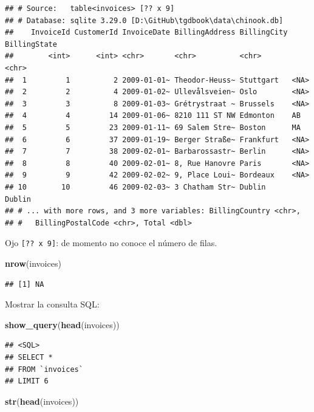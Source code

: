 \documentclass[]{book}
\newenvironment{Shaded}{\begin{snugshade}}{\end{snugshade}}
\newcommand{\KeywordTok}[1]{\textcolor[rgb]{0.13,0.29,0.53}{\textbf{#1}}}
\newcommand{\NormalTok}[1]{#1}
\begin{document}
\begin{verbatim}
## # Source:   table<invoices> [?? x 9]
## # Database: sqlite 3.29.0 [D:\GitHub\tgdbook\data\chinook.db]
##    InvoiceId CustomerId InvoiceDate BillingAddress BillingCity BillingState
##        <int>      <int> <chr>       <chr>          <chr>       <chr>       
##  1         1          2 2009-01-01~ Theodor-Heuss~ Stuttgart   <NA>        
##  2         2          4 2009-01-02~ Ullevålsveien~ Oslo        <NA>        
##  3         3          8 2009-01-03~ Grétrystraat ~ Brussels    <NA>        
##  4         4         14 2009-01-06~ 8210 111 ST NW Edmonton    AB          
##  5         5         23 2009-01-11~ 69 Salem Stre~ Boston      MA          
##  6         6         37 2009-01-19~ Berger Straße~ Frankfurt   <NA>        
##  7         7         38 2009-02-01~ Barbarossastr~ Berlin      <NA>        
##  8         8         40 2009-02-01~ 8, Rue Hanovre Paris       <NA>        
##  9         9         42 2009-02-02~ 9, Place Loui~ Bordeaux    <NA>        
## 10        10         46 2009-02-03~ 3 Chatham Str~ Dublin      Dublin      
## # ... with more rows, and 3 more variables: BillingCountry <chr>,
## #   BillingPostalCode <chr>, Total <dbl>
\end{verbatim}

Ojo \texttt{{[}??\ x\ 9{]}}: de momento no conoce el número de filas.

\begin{Shaded}
\begin{Highlighting}[]
\KeywordTok{nrow}\NormalTok{(invoices)}
\end{Highlighting}
\end{Shaded}

\begin{verbatim}
## [1] NA
\end{verbatim}

Mostrar la consulta SQL:

\begin{Shaded}
\begin{Highlighting}[]
\KeywordTok{show_query}\NormalTok{(}\KeywordTok{head}\NormalTok{(invoices))}
\end{Highlighting}
\end{Shaded}

\begin{verbatim}
## <SQL>
## SELECT *
## FROM `invoices`
## LIMIT 6
\end{verbatim}

\begin{Shaded}
\begin{Highlighting}[]
\KeywordTok{str}\NormalTok{(}\KeywordTok{head}\NormalTok{(invoices))}
\end{Highlighting}
\end{Shaded}
\end{document}

